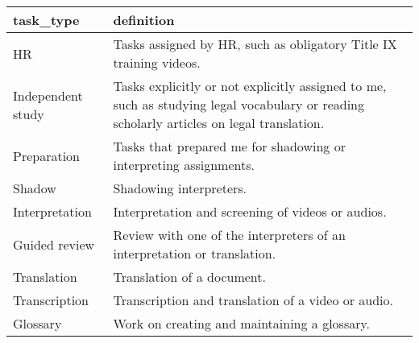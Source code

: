 \begin{table}
\centering
\begin{tabular}{l|l}
\hline
task\_type & definition\\
\hline
HR & Tasks assigned by HR, such as obligatory Title IX training videos.\\
\hline
Independent study & Tasks explicitly or not explicitly assigned to me, such as studying legal vocabulary or reading scholarly articles on legal translation.\\
\hline
Preparation & Tasks that prepared me for shadowing or interpreting assignments.\\
\hline
Shadow & Shadowing interpreters.\\
\hline
Interpretation & Interpretation and screening of videos or audios.\\
\hline
Guided review & Review with one of the interpreters of an interpretation or translation.\\
\hline
Translation & Translation of a document.\\
\hline
Transcription & Transcription and translation of a video or audio.\\
\hline
Glossary & Work on creating and maintaining a glossary.\\
\hline
\end{tabular}
\end{table}
